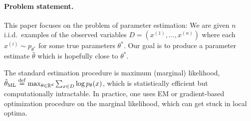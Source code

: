 \paragraph{Problem statement.}

This paper focuses on the problem of parameter estimation:
We are given $n$ i.i.d.~examples of the observed variables $D = (x^{(1)}, \dots, x^{(n)})$
where each $x^{(i)} \sim p_{\theta^*}$ for some true parameters $\theta^*$.
Our goal is to produce a parameter estimate $\hat\theta$ which is hopefully
close to $\theta^*$.

The standard estimation procedure is maximum (marginal) likelihood,
$\hat\theta_\text{\rm ML} \stackrel{\rm def}{=} \max_{\theta \in \mathbb{R}^d} \sum_{x \in D} \log p_\theta(x)$,
which is statistically efficient but computationally intractable.
In practice, one uses EM or gradient-based optimization procedure on the marginal likelihood,
which can get stuck in local optima.


